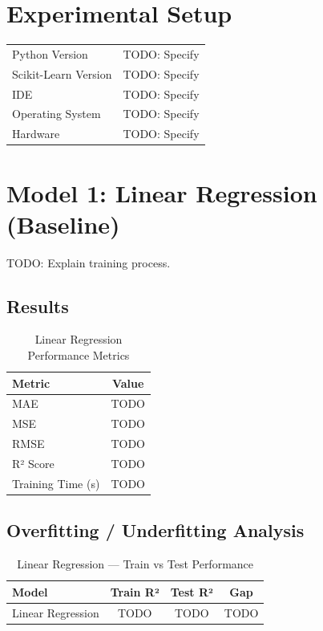 \documentclass[12pt,a4paper]{article}
\begin{document}
\section{Experimental Setup}
\begin{tabular}{ll}
\toprule
Python Version & TODO: Specify \\
Scikit-Learn Version & TODO: Specify \\
IDE & TODO: Specify \\
Operating System & TODO: Specify \\
Hardware & TODO: Specify \\
\bottomrule
\end{tabular}

\section{Model 1: Linear Regression (Baseline)}
TODO: Explain training process.

\subsection{Results}
\begin{table}[H]
\centering
\begin{tabular}{lc}
\toprule
\textbf{Metric} & \textbf{Value} \\ \midrule
MAE & TODO \\
MSE & TODO \\
RMSE & TODO \\
R² Score & TODO \\
Training Time (s) & TODO \\
\bottomrule
\end{tabular}
\caption{Linear Regression Performance Metrics}
\end{table}

\subsection{Overfitting / Underfitting Analysis}
\begin{table}[H]
\centering
\begin{tabular}{lccc}
\toprule
\textbf{Model} & \textbf{Train R²} & \textbf{Test R²} & \textbf{Gap} \\ \midrule
Linear Regression & TODO & TODO & TODO \\
\bottomrule
\end{tabular}
\caption{Linear Regression — Train vs Test Performance}
\end{table}
\end{document}
